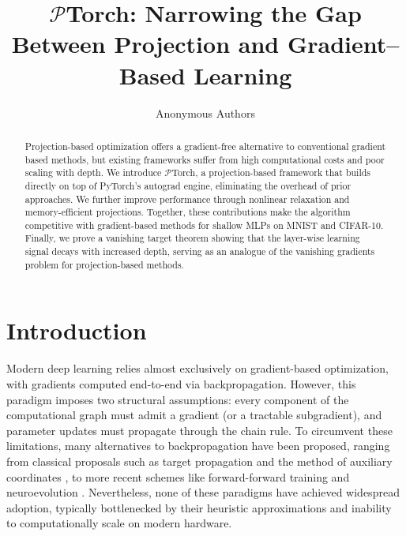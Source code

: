 \documentclass{article}
\title{$\mathcal{P}$Torch: Narrowing the Gap Between Projection and Gradient--Based Learning}
\author{Anonymous Authors}
\theoremstyle{plain}
\theoremstyle{definition}
\theoremstyle{remark}
\begin{document}
\maketitle

\begin{abstract}
Projection-based optimization offers a gradient-free alternative to conventional gradient based methods, but existing frameworks suffer from high computational costs and poor scaling with depth. We introduce $\mathcal{P}$Torch, a projection-based framework that builds directly on top of PyTorch's autograd engine, eliminating the overhead of prior approaches. We further improve performance through nonlinear relaxation and memory-efficient projections. Together, these contributions make the algorithm competitive with gradient-based methods for shallow MLPs on MNIST and CIFAR-10. Finally, we prove a vanishing target theorem showing that the layer-wise learning signal decays with increased depth, serving as an analogue of the vanishing gradients problem for projection-based methods.
\end{abstract}

\section{Introduction}
Modern deep learning relies almost exclusively on gradient-based optimization, with gradients computed end-to-end via backpropagation. However, this paradigm imposes two structural assumptions: every component of the computational graph must admit a gradient (or a tractable subgradient), and parameter updates must propagate through the chain rule. To circumvent these limitations, many alternatives to backpropagation have been proposed, ranging from classical proposals such as target propagation \cite{lee2015difference} and the method of auxiliary coordinates \cite{carreira2014distributed}, to more recent schemes like forward-forward training \cite{hinton2022forward} and neuroevolution \cite{such2017deep}. Nevertheless, none of these paradigms have achieved widespread adoption, typically bottlenecked by their heuristic approximations and inability to computationally scale on modern hardware.
\end{document}
